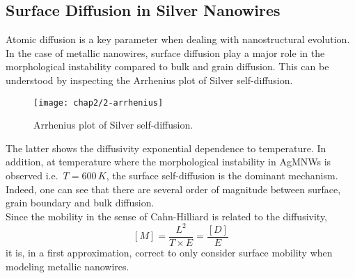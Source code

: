 \subsection{Surface Diffusion in Silver Nanowires}
    Atomic diffusion is a key parameter when dealing with nanostructural evolution. In the case of metallic nanowires, surface diffusion play a major role in the morphological instability compared to bulk and grain diffusion. This can be understood by inspecting the Arrhenius plot of Silver self-diffusion.
    \begin{figure}[H]
        \centering
        \texttt{[image: chap2/2-arrhenius]}
        \caption{Arrhenius plot of Silver self-diffusion. \cite{Wejranowski2020}}
        \label{fig:2-arrhenius}
    \end{figure}
    The latter shows the diffusivity exponential dependence to temperature. In addition, at temperature where the morphological instability in AgMNWs is observed i.e.\ $T=600\,K$, the surface self-diffusion is the dominant mechanism. Indeed, one can see that there are several order of magnitude between surface, grain boundary and bulk diffusion.\\
    Since the mobility in the sense of Cahn-Hilliard is related to the diffusivity,
    \begin{equation}
        \left[M\right] = \frac{L^2}{T\times E} = \frac{\left[D\right]}{E}
    \end{equation}
    it is, in a first approximation, correct to only consider surface mobility when modeling metallic nanowires.